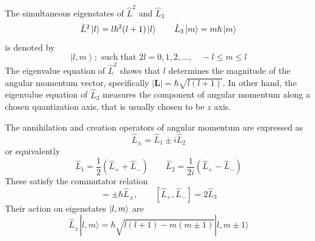 \documentclass[../../../main.tex]{subfiles}
\begin{document}
The simultaneous eigenstates of $\hat{L}^2$ and $\hat{L}_3$
\begin{equation*}
    \hat{L}^2 \ket{l} = l \hbar ^2 (l+1) \ket{l} \qquad
    \hat{L }_3 \ket{m}= m \hbar \ket{m} 
\end{equation*}
is denoted by
\begin{equation*}
    \left| l, m \right\rangle; \text{ such that } 2l = 0, 1, 2, \ldots, \quad -l \leq m \leq l
\end{equation*}
The eigenvalue equation of $\hat{L}^2$ shows that $l$ determines the magnitude of the angular momentum vector, specifically $|\mathbf{L}|=\hbar \sqrt{l(l+1)}$.
In other hand, the eigenvalue equation of $\hat{L }_3$ measures the component of angular momentum along a chosen quantization axis, that is usually chosen to be $z$ axis.

The annihilation and  creation operators of angular momentum are expressed as
\begin{equation*}
    \hat{L}_{\pm} = \hat{L}_1 \pm i \hat{L}_2
\end{equation*}
or equivalently
\begin{equation*}
    \hat{L}_1 = \frac{1}{2}(\hat{L}_{+} + \hat{L}_{-})\qquad
    \hat{L}_2 = \frac{1}{2i}(\hat{L}_{+} - \hat{L}_{-})
\end{equation*}
These satisfy the commutator relation
\begin{equation*}
    [\hat{L}_3,\hat{L}_{\pm}] = \pm \hbar  \hat{L}_{\pm}, \qquad
    [\hat{L}_+,\hat{L}_-]=2\hat{L}_3
\end{equation*}
Their action on eigenstates $\ket{l,m}$ are
\begin{equation*}
    \hat{L}_{\pm}   |l, m\rangle = \hbar \sqrt{l(l+1) - m(m \pm 1)}   |l, m \pm 1\rangle
\end{equation*}
\end{document}
